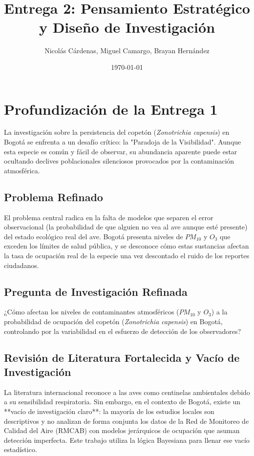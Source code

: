 \documentclass[12pt]{article}
\title{Entrega 2: Pensamiento Estratégico y Diseño de Investigación}
\author{Nicolás Cárdenas, Miguel Camargo, Brayan Hernández}
\date{\today}
\begin{document}
\maketitle

\section{Profundización de la Entrega 1}

La investigación sobre la persistencia del copetón (\textit{Zonotrichia capensis}) en Bogotá se enfrenta a un desafío crítico: la "Paradoja de la Visibilidad". Aunque esta especie es común y fácil de observar, su abundancia aparente puede estar ocultando declives poblacionales silenciosos provocados por la contaminación atmosférica. 

\subsection*{Problema Refinado}
El problema central radica en la falta de modelos que separen el error observacional (la probabilidad de que alguien no vea al ave aunque esté presente) del estado ecológico real del ave. Bogotá presenta niveles de $PM_{10}$ y $O_3$ que exceden los límites de salud pública, y se desconoce cómo estas sustancias afectan la tasa de ocupación real de la especie una vez descontado el ruido de los reportes ciudadanos.

\subsection*{Pregunta de Investigación Refinada}
¿Cómo afectan los niveles de contaminantes atmosféricos ($PM_{10}$ y $O_3$) a la probabilidad de ocupación del copetón (\textit{Zonotrichia capensis}) en Bogotá, controlando por la variabilidad en el esfuerzo de detección de los observadores?

\subsection*{Revisión de Literatura Fortalecida y Vacío de Investigación}
La literatura internacional reconoce a las aves como centinelas ambientales debido a su sensibilidad respiratoria. Sin embargo, en el contexto de Bogotá, existe un **vacío de investigación claro**: la mayoría de los estudios locales son descriptivos y no analizan de forma conjunta los datos de la Red de Monitoreo de Calidad del Aire (RMCAB) con modelos jerárquicos de ocupación que asuman detección imperfecta. Este trabajo utiliza la lógica Bayesiana para llenar ese vacío estadístico.
\end{document}
